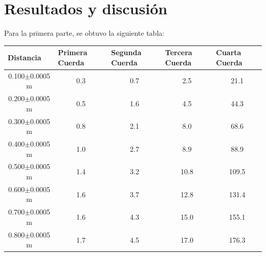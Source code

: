 \documentclass[article,12pt]{elsarticle}
\begin{document}
\section{Resultados y discusión}
    Para la primera parte, se obtuvo la siguiente tabla:
    \begin{table}[H]
\begin{tabular}{|c|c|c|c|c|}
\hline
\multicolumn{1}{|l|}{Distancia} & \multicolumn{1}{l|}{Primera Cuerda} & \multicolumn{1}{l|}{Segunda Cuerda} & \multicolumn{1}{l|}{Tercera Cuerda} & \multicolumn{1}{l|}{Cuarta Cuerda} \\ \hline
0.100$\pm$0.0005 m                                                     & 0.3                                 & 0.7                                 & 2.5                                 & 21.1                               \\ \hline
0.200$\pm$0.0005 m                                                    & 0.5                                 & 1.6                                 & 4.5                                 & 44.3                               \\ \hline
0.300$\pm$0.0005 m                                                    & 0.8                                 & 2.1                                 & 8.0                                   & 68.6                               \\ \hline
0.400$\pm$0.0005 m                                                   & 1.0                                   & 2.7                                 & 8.9                                 & 88.9                               \\ \hline
0.500$\pm$0.0005 m                                                  & 1.4                                 & 3.2                                 & 10.8                                & 109.5                              \\ \hline
0.600$\pm$0.0005 m                                                   & 1.6                                 & 3.7                                 & 12.8                                & 131.4                              \\ \hline
0.700$\pm$0.0005 m                                                    & 1.6                                 & 4.3                                 & 15.0                                  & 155.1                              \\ \hline
0.800$\pm$0.0005 m                                                  & 1.7                                 & 4.5                                 & 17.0                                  & 176.3                              \\ \hline

\end{tabular}
\end{table}
\end{document}
